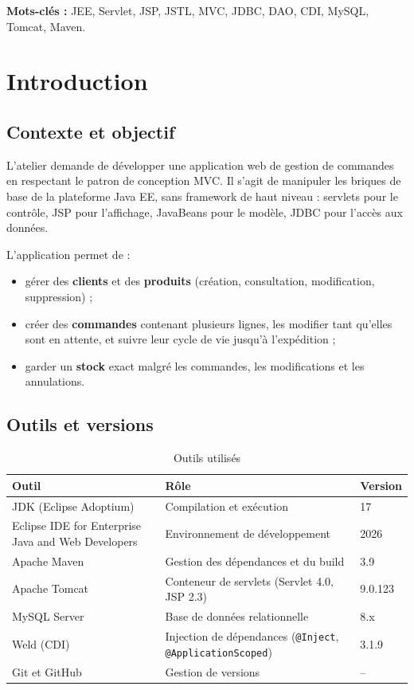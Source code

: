 \documentclass[11pt,a4paper]{report}
\begin{document}
\textbf{Mots-cl\'es :} JEE, Servlet, JSP, JSTL, MVC, JDBC, DAO, CDI, MySQL, Tomcat, Maven.

\tableofcontents
\listoffigures
\listoftables

\chapter{Introduction}
\section{Contexte et objectif}
L'atelier demande de d\'evelopper une application web de gestion de commandes en respectant le patron de conception MVC. Il s'agit de manipuler les briques de base de la plateforme Java EE, sans framework de haut niveau : servlets pour le contr\^ole, JSP pour l'affichage, JavaBeans pour le mod\`ele, JDBC pour l'acc\`es aux donn\'ees.

L'application permet de :
\begin{itemize}
  \item g\'erer des \textbf{clients} et des \textbf{produits} (cr\'eation, consultation, modification, suppression) ;
  \item cr\'eer des \textbf{commandes} contenant plusieurs lignes, les modifier tant qu'elles sont en attente, et suivre leur cycle de vie jusqu'\`a l'exp\'edition ;
  \item garder un \textbf{stock} exact malgr\'e les commandes, les modifications et les annulations.
\end{itemize}

\section{Outils et versions}
\begin{table}[H]
\centering
\caption{Outils utilis\'es}\label{tab:outils}
\begin{tabularx}{\textwidth}{@{}lXl@{}}
\toprule
\textbf{Outil} & \textbf{R\^ole} & \textbf{Version}\\
\midrule
JDK (Eclipse Adoptium) & Compilation et ex\'ecution & 17\\
Eclipse IDE for Enterprise Java and Web Developers & Environnement de d\'eveloppement & 2026\\
Apache Maven & Gestion des d\'ependances et du build & 3.9\\
Apache Tomcat & Conteneur de servlets (Servlet 4.0, JSP 2.3) & 9.0.123\\
MySQL Server & Base de donn\'ees relationnelle & 8.x\\
Weld (CDI) & Injection de d\'ependances (\texttt{@Inject}, \texttt{@ApplicationScoped}) & 3.1.9\\
Git et GitHub & Gestion de versions & --\\
\bottomrule
\end{tabularx}
\end{table}
\end{document}
